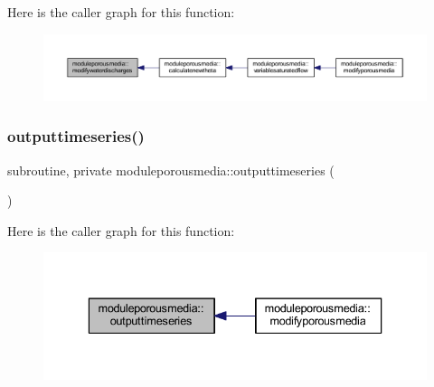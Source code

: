 Here is the caller graph for this function\+:\nopagebreak
\begin{figure}[H]
\begin{center}
\leavevmode
\includegraphics[width=350pt]{namespacemoduleporousmedia_a1a0af39f7098b5de11c64c15cb6f4c39_icgraph}
\end{center}
\end{figure}
\mbox{\label{namespacemoduleporousmedia_a25ea91b53937b18722679c44410dd4db}} 
\subsubsection{\texorpdfstring{outputtimeseries()}{outputtimeseries()}}
{\footnotesize\ttfamily subroutine, private moduleporousmedia\+::outputtimeseries (\begin{DoxyParamCaption}{ }\end{DoxyParamCaption})\hspace{0.3cm}{\ttfamily [private]}}

Here is the caller graph for this function\+:\nopagebreak
\begin{figure}[H]
\begin{center}
\leavevmode
\includegraphics[width=336pt]{namespacemoduleporousmedia_a25ea91b53937b18722679c44410dd4db_icgraph}
\end{center}
\end{figure}
\mbox{\label{namespacemoduleporousmedia_a2bde5212b61a523c797e44d2787e0e7d}} 
